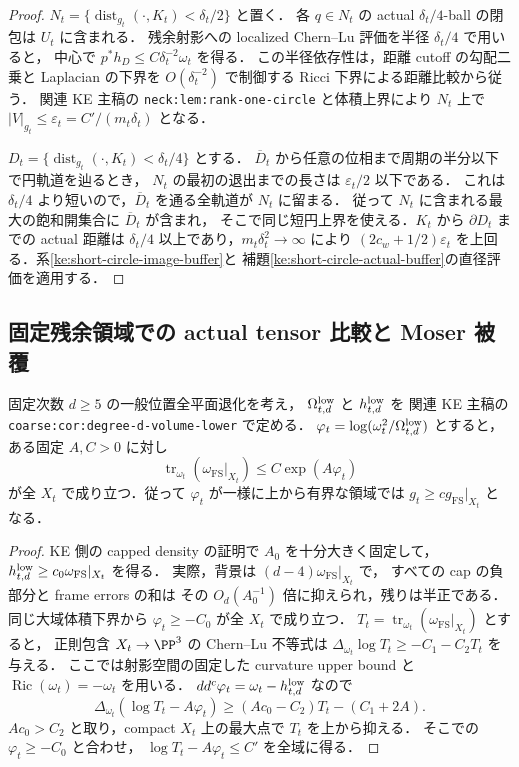 \begin{proof}
$N_t=\{\operatorname{dist}_{g_t}(\cdot,K_t)<\delta_t/2\}$ と置く．
各 $q\in N_t$ の actual $\delta_t/4$-ball の閉包は $U_t$ に含まれる．
残余射影への localized Chern--Lu 評価を半径 $\delta_t/4$ で用いると，
中心で $p^*h_D\le C\delta_t^{-2}\omega_t$ を得る．
この半径依存性は，距離 cutoff の勾配二乗と Laplacian の下界を
$O(\delta_t^{-2})$ で制御する Ricci 下界による距離比較から従う．
関連 KE 主稿の \texttt{neck:lem:rank-one-circle} と体積上界により
$N_t$ 上で $|V|_{g_t}\le\varepsilon_t=C'/(m_t\delta_t)$ となる．

$D_t=\{\operatorname{dist}_{g_t}(\cdot,K_t)<\delta_t/4\}$ とする．
$\overline D_t$ から任意の位相まで周期の半分以下で円軌道を辿るとき，
$N_t$ の最初の退出までの長さは $\varepsilon_t/2$ 以下である．
これは $\delta_t/4$ より短いので，$\overline D_t$ を通る全軌道が $N_t$ に留まる．
従って $N_t$ に含まれる最大の飽和開集合に $\overline D_t$ が含まれ，
そこで同じ短円上界を使える．$K_t$ から $\partial D_t$ までの actual 距離は
$\delta_t/4$ 以上であり，$m_t\delta_t^2\to\infty$ により
$(2c_w+1/2)\varepsilon_t$ を上回る．系\ref{ke:short-circle-image-buffer}と
補題\ref{ke:short-circle-actual-buffer}の直径評価を適用する．
\end{proof}

\subsection{固定残余領域での actual tensor 比較と Moser 被覆}

\begin{lemma}
\label{ke:capped-projective-lower}
固定次数 $d\ge5$ の一般位置全平面退化を考え，
$\Omega_{t,d}^{\rm low}$ と $h_{t,d}^{\rm low}$ を
関連 KE 主稿の \texttt{coarse:cor:degree-d-volume-lower} で定める．
$\varphi_t=\log(\omega_t^2/\Omega_{t,d}^{\rm low})$ とすると，
ある固定 $A,C>0$ に対し
\[
 \operatorname{tr}_{\omega_t}(\omega_{\mathrm{FS}}|_{X_t})
 \le C\exp(A\varphi_t)
\]
が全 $X_t$ で成り立つ．従って $\varphi_t$ が一様に上から有界な領域では
$g_t\ge c g_{\mathrm{FS}}|_{X_t}$ となる．
\end{lemma}

\begin{proof}
KE 側の capped density の証明で $A_0$ を十分大きく固定して，
$h_{t,d}^{\rm low}\ge c_0\omega_{\mathrm{FS}}|_{X_t}$ を得る．
実際，背景は $(d-4)\omega_{\mathrm{FS}}|_{X_t}$ で，
すべての cap の負部分と frame errors の和は
その $O_d(A_0^{-1})$ 倍に抑えられ，残りは半正である．
同じ大域体積下界から $\varphi_t\ge-C_0$ が全 $X_t$ で成り立つ．
$T_t=\operatorname{tr}_{\omega_t}(\omega_{\mathrm{FS}}|_{X_t})$ とすると，
正則包含 $X_t\to\PP^3$ の Chern--Lu 不等式は
$\Delta_{\omega_t}\log T_t\ge-C_1-C_2 T_t$ を与える．
ここでは射影空間の固定した curvature upper bound と
$\operatorname{Ric}(\omega_t)=-\omega_t$ を用いる．
$dd^c\varphi_t=\omega_t-h_{t,d}^{\rm low}$ なので
\[
 \Delta_{\omega_t}(\log T_t-A\varphi_t)
 \ge (Ac_0-C_2)T_t-(C_1+2A).
\]
$Ac_0>C_2$ と取り，compact $X_t$ 上の最大点で $T_t$ を上から抑える．
そこでの $\varphi_t\ge-C_0$ と合わせ，
$\log T_t-A\varphi_t\le C'$ を全域に得る．
\end{proof}

